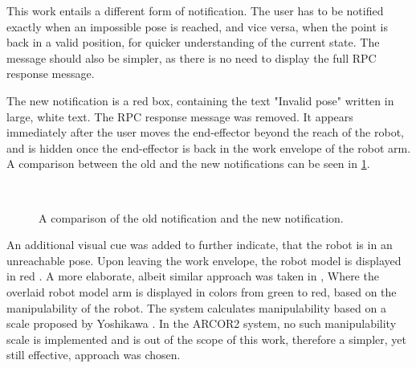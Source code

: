 This work entails a different form of notification. The user has to be notified exactly when an impossible pose is reached, and vice versa, when the point is back in a valid position, for quicker understanding of the current state. The message should also be simpler, as there is no need to display the full RPC response message.

The new notification is a red box, containing the text "Invalid pose" written in large, white text. The RPC response message was removed. It appears immediately after the user moves the end-effector beyond the reach of the robot, and is hidden once the end-effector is back in the work envelope of the robot arm. A comparison between the old and the new notifications can be seen in \ref{fig:notifications}.

\begin{figure}[h]
    \centering
    \\
    
    \caption{A comparison of the old notification and the new notification.}
    \label{fig:notifications}
\end{figure}

An additional visual cue was added to further indicate, that the robot is in an unreachable pose. Upon leaving the work envelope, the robot model is displayed in red . A more elaborate, albeit similar approach was taken in \cite{ONG2020101820}, Where the overlaid robot model arm is displayed in colors from green to red, based on the manipulability of the robot. The system calculates manipulability based on a scale proposed by Yoshikawa \cite{yoshikawa}. In the ARCOR2 system, no such manipulability scale is implemented and is out of the scope of this work, therefore a simpler, yet still effective, approach was chosen.

